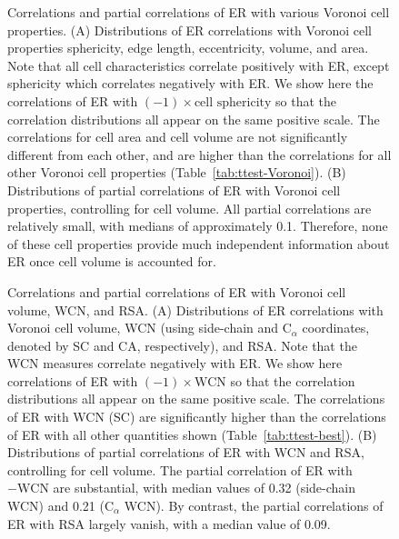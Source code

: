 \documentclass[12pt]{article}
\begin{document}
    \begin{figure}
        \caption{Correlations and partial correlations of ER with various Voronoi cell properties. (A) Distributions of ER correlations with Voronoi cell properties sphericity, edge length, eccentricity, volume, and area. Note that all cell characteristics correlate positively with ER, except sphericity which correlates negatively with ER. We show here the correlations of ER with $(-1)\times \text{cell sphericity}$ so that the correlation distributions all appear on the same positive scale. The correlations for cell area and cell volume are not significantly different from each other, and are higher than the correlations for all other Voronoi cell properties (Table~\ref{tab:ttest-Voronoi}). (B) Distributions of partial correlations of ER with Voronoi cell properties, controlling for cell volume. All partial correlations are relatively small, with medians of approximately 0.1. Therefore, none of these cell properties provide much independent information about ER once cell volume is accounted for.}
        \label{fig:voronoi_ER_screen}
    \end{figure}
    

    \begin{figure}
        \caption{Correlations and partial correlations of ER with Voronoi cell volume, WCN, and RSA. (A) Distributions of ER correlations with Voronoi cell volume, WCN (using side-chain and C$_\alpha$  coordinates, denoted by SC and CA, respectively), and RSA. Note that the WCN measures correlate negatively with ER. We show here correlations of ER with $(-1)\times \text{WCN}$ so that the correlation distributions all appear on the same positive scale. The correlations of ER with WCN (SC) are significantly higher than the correlations of ER with all other quantities shown (Table~\ref{tab:ttest-best}). (B) Distributions of partial correlations of ER with WCN and RSA, controlling for cell volume. The partial correlation of ER with $-\text{WCN}$ are substantial, with median values of 0.32 (side-chain WCN) and 0.21 (C$_\alpha$ WCN). By contrast, the partial correlations of ER with RSA largely vanish, with a median value of 0.09.} \label{fig:best_predictorER}
    \end{figure}
\end{document}
